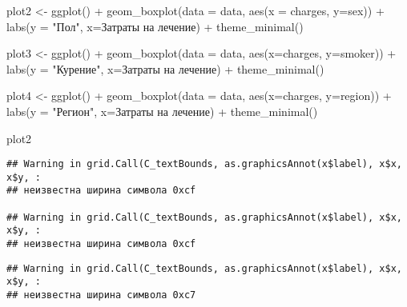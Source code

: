 \documentclass[
]{article}
\newenvironment{Shaded}{\begin{snugshade}}{\end{snugshade}}
\newcommand{\AttributeTok}[1]{\textcolor[rgb]{0.77,0.63,0.00}{#1}}
\newcommand{\FunctionTok}[1]{\textcolor[rgb]{0.00,0.00,0.00}{#1}}
\newcommand{\NormalTok}[1]{#1}
\newcommand{\OtherTok}[1]{\textcolor[rgb]{0.56,0.35,0.01}{#1}}
\newcommand{\SpecialCharTok}[1]{\textcolor[rgb]{0.00,0.00,0.00}{#1}}
\newcommand{\StringTok}[1]{\textcolor[rgb]{0.31,0.60,0.02}{#1}}
\begin{document}
\begin{Shaded}
\begin{Highlighting}[]
\NormalTok{plot2 }\OtherTok{\textless{}{-}} \FunctionTok{ggplot}\NormalTok{() }\SpecialCharTok{+}
  \FunctionTok{geom\_boxplot}\NormalTok{(}\AttributeTok{data =}\NormalTok{ data, }\FunctionTok{aes}\NormalTok{(}\AttributeTok{x =}\NormalTok{ charges, }\AttributeTok{y=}\NormalTok{sex)) }\SpecialCharTok{+}
  \FunctionTok{labs}\NormalTok{(}\AttributeTok{y =} \StringTok{"Пол"}\NormalTok{, }\AttributeTok{x=}\StringTok{\textquotesingle{}Затраты на лечение\textquotesingle{}}\NormalTok{) }\SpecialCharTok{+}
  \FunctionTok{theme\_minimal}\NormalTok{() }
  
\NormalTok{plot3 }\OtherTok{\textless{}{-}} \FunctionTok{ggplot}\NormalTok{() }\SpecialCharTok{+}
  \FunctionTok{geom\_boxplot}\NormalTok{(}\AttributeTok{data =}\NormalTok{ data, }\FunctionTok{aes}\NormalTok{(}\AttributeTok{x=}\NormalTok{charges, }\AttributeTok{y=}\NormalTok{smoker)) }\SpecialCharTok{+}
  \FunctionTok{labs}\NormalTok{(}\AttributeTok{y =} \StringTok{"Курение"}\NormalTok{, }\AttributeTok{x=}\StringTok{\textquotesingle{}Затраты на лечение\textquotesingle{}}\NormalTok{) }\SpecialCharTok{+}
  \FunctionTok{theme\_minimal}\NormalTok{() }

\NormalTok{plot4 }\OtherTok{\textless{}{-}} \FunctionTok{ggplot}\NormalTok{() }\SpecialCharTok{+}
  \FunctionTok{geom\_boxplot}\NormalTok{(}\AttributeTok{data =}\NormalTok{ data, }\FunctionTok{aes}\NormalTok{(}\AttributeTok{x=}\NormalTok{charges, }\AttributeTok{y=}\NormalTok{region)) }\SpecialCharTok{+}
  \FunctionTok{labs}\NormalTok{(}\AttributeTok{y =} \StringTok{"Регион"}\NormalTok{, }\AttributeTok{x=}\StringTok{\textquotesingle{}Затраты на лечение\textquotesingle{}}\NormalTok{) }\SpecialCharTok{+}
  \FunctionTok{theme\_minimal}\NormalTok{() }

\NormalTok{plot2}
\end{Highlighting}
\end{Shaded}

\begin{verbatim}
## Warning in grid.Call(C_textBounds, as.graphicsAnnot(x$label), x$x, x$y, :
## неизвестна ширина символа 0xcf

## Warning in grid.Call(C_textBounds, as.graphicsAnnot(x$label), x$x, x$y, :
## неизвестна ширина символа 0xcf
\end{verbatim}

\begin{verbatim}
## Warning in grid.Call(C_textBounds, as.graphicsAnnot(x$label), x$x, x$y, :
## неизвестна ширина символа 0xc7
\end{verbatim}
\end{document}
